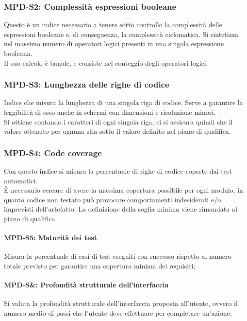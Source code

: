 \subsubsection{MPD-S2: Complessità espressioni booleane}
Questo è un indice necessario a tenere sotto controllo la complessità delle espressioni booleane e, di conseguenza, la complessità ciclomatica.
Si sintetizza nel massimo numero di operatori logici presenti in una singola espressione booleana.\\
Il suo calcolo è banale, e consiste nel conteggio degli operatori logici.

\subsubsection{MPD-S3: Lunghezza delle righe di codice}
Indice che misura la lunghezza di una singola riga di codice. Serve a garantire la leggibilità di esso anche in schermi
con dimensioni e risoluzione minori.\\
Si ottiene contando i caratteri di ogni singola riga, ci si assicura quindi che il valore ottenuto per ognuna stia sotto il valore
definito nel piano di qualifica.

\subsubsection{MPD-S4: Code coverage}
Con questo indice si misura la percentuale di righe di codice coperte dai test automatici.\\
È necessario cercare di avere la massima copertura possibile per ogni modulo, in quanto codice non testato
può provocare comportamenti indesiderati e/o imprevisti dell'artefatto. La definizione della soglia minima viene rimandata al piano di qualifica.


\paragraph{MPD-S5: Maturità dei test}
Misura la percentuale di casi di test eseguiti con successo rispetto al numero totale previsto per garantire una copertura minima dei requisiti;


\paragraph{MPD-S&: Profondità strutturale dell'interfaccia}
Si valuta la profondità strutturale dell'interfaccia proposta all'utente, ovvero il numero medio di passi che l'utente deve effettuare per completare un'azione;
